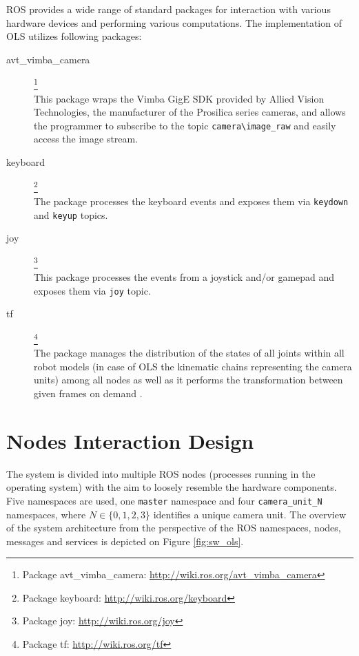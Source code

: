 	ROS provides a wide range of standard packages for interaction with various hardware devices and performing various computations. The implementation of OLS utilizes following packages:
	
	\begin{description}
		\item[avt\_vimba\_camera]\footnote{Package avt\_vimba\_camera: \url{http://wiki.ros.org/avt_vimba_camera}} \hfill \\
		This package wraps the Vimba GigE SDK provided by Allied Vision Technologies, the manufacturer of the Prosilica series cameras, and allows the programmer to subscribe to the topic \texttt{camera\textbackslash image\_raw} and easily access the image stream.
		
		\item[keyboard]\footnote{Package keyboard: \url{http://wiki.ros.org/keyboard}} \hfill \\
		The package processes the keyboard events and exposes them via \texttt{keydown} and \texttt{keyup} topics.
		
		\item[joy]\footnote{Package joy: \url{http://wiki.ros.org/joy}} \hfill \\
		This package processes the events from a joystick and/or gamepad and exposes them via \texttt{joy} topic.
		
		\item[tf]\footnote{Package tf: \url{http://wiki.ros.org/tf}} \hfill \\
		The package manages the distribution of the states of all joints within all robot models (in case of OLS the kinematic chains representing the camera units) among all nodes as well as it performs the transformation between given frames on demand \cite{tf}.
		
	\end{description}
	
	
	\section{Nodes Interaction Design}
	
	
	The system is divided into multiple ROS nodes (processes running in the operating system) with the aim to loosely resemble the hardware components. Five namespaces are used, one \texttt{master} namespace and four \texttt{camera\_unit\_N} namespaces, where $N \in \{0, 1, 2, 3\}$ identifies a unique camera unit. The overview of the system architecture from the perspective of the ROS namespaces, nodes, messages and services is depicted on Figure \ref{fig:sw_ols}.
	
